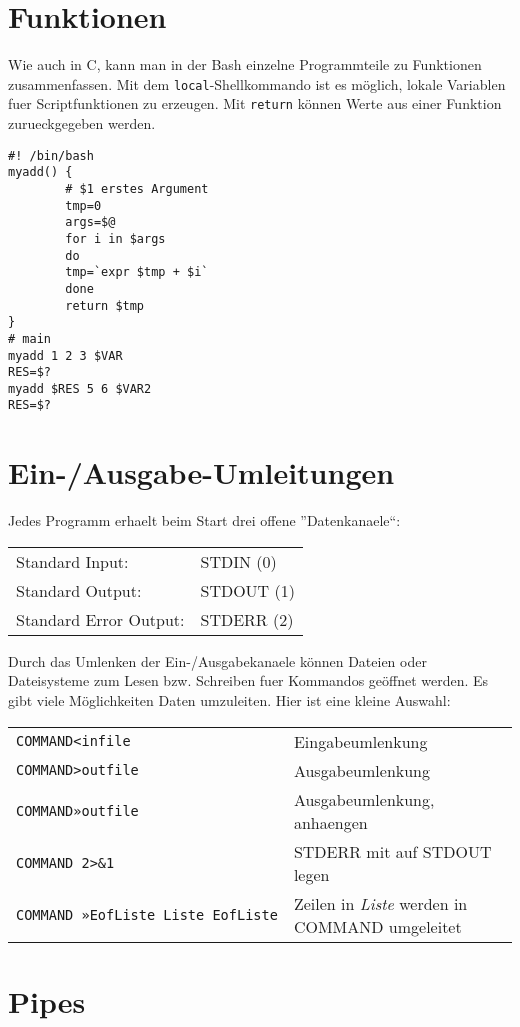 \documentclass[12pt,]{article}
\begin{document}
\section{Funktionen}\label{funktionen}

Wie auch in C, kann man in der Bash einzelne Programmteile zu Funktionen
zusammenfassen. Mit dem \texttt{local}-Shellkommando ist es möglich,
lokale Variablen fuer Scriptfunktionen zu erzeugen. Mit \texttt{return}
können Werte aus einer Funktion zurueckgegeben werden.

\begin{verbatim}
#! /bin/bash
myadd() {
        # $1 erstes Argument
        tmp=0
        args=$@
        for i in $args
        do
        tmp=`expr $tmp + $i`
        done
        return $tmp
}
# main
myadd 1 2 3 $VAR
RES=$?
myadd $RES 5 6 $VAR2
RES=$?
\end{verbatim}

\section{Ein-/Ausgabe-Umleitungen}\label{ein-ausgabe-umleitungen}

Jedes Programm erhaelt beim Start drei offene ''Datenkanaele``:

\begin{longtable}[c]{@{}ll@{}}
\toprule
Standard Input: & STDIN (0)\tabularnewline
Standard Output: & STDOUT (1)\tabularnewline
Standard Error Output: & STDERR (2)\tabularnewline
\bottomrule
\end{longtable}

Durch das Umlenken der Ein-/Ausgabekanaele können Dateien oder
Dateisysteme zum Lesen bzw. Schreiben fuer Kommandos geöffnet werden. Es
gibt viele Möglichkeiten Daten umzuleiten. Hier ist eine kleine Auswahl:

\begin{longtable}[c]{@{}ll@{}}
\toprule
\texttt{COMMAND\textless{}infile} & Eingabeumlenkung\tabularnewline
\texttt{COMMAND\textgreater{}outfile} & Ausgabeumlenkung\tabularnewline
\texttt{COMMAND»outfile} & Ausgabeumlenkung, anhaengen\tabularnewline
\texttt{COMMAND\ 2\textgreater{}\&1} & STDERR mit auf STDOUT
legen\tabularnewline
\texttt{COMMAND\ »EofListe\ Liste\ EofListe} & Zeilen in \emph{Liste}
werden in COMMAND umgeleitet\tabularnewline
\bottomrule
\end{longtable}

\section{Pipes}\label{pipes}
\end{document}
